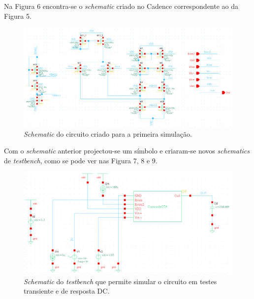 \documentclass[11pt]{article}
\numberwithin{equation}{section}
\begin{document}
Na Figura 6 encontra-se o \textit{schematic} criado no Cadence correspondente ao da Figura 5.

\begin{figure}[H]
	\centering
	\includegraphics[keepaspectratio=true, scale=0.80]{exps/Woriginais}
	\vspace{-0.5em}
	\caption{\textit{Schematic} do circuito criado para a primeira simulação.}
	\label{fig:schematic1}
	\vspace{-0.8em}
\end{figure} 

Com o \textit{schematic} anterior projectou-se um símbolo e criaram-se novos \textit{schematics} de \textit{testbench}, como se pode ver nas Figura 7, 8 e 9.

\vspace{3mm}

\begin{figure}[H]
	\centering
	\includegraphics[keepaspectratio=true, scale=0.60]{exps/TBdctrans}
	\vspace{-0.5em}
	\caption{\textit{Schematic} do \textit{testbench} que permite simular o circuito em testes transiente e de resposta DC.}
	\vspace{-0.8em}
\end{figure} 
\end{document}
